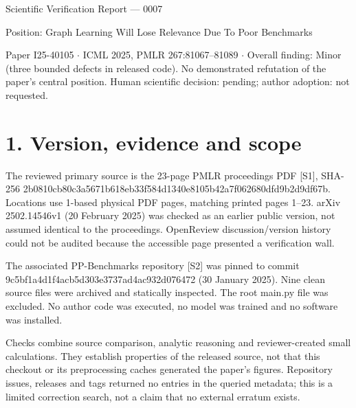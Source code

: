 \documentclass[10pt]{article}
\begin{document}
Scientific Verification Report — 0007\par
Position: Graph Learning Will Lose Relevance Due To Poor Benchmarks\par
Paper I25-40105 \(\cdot\) ICML 2025, PMLR 267:81067–81089 \(\cdot\) Overall finding: Minor (three bounded defects in released code). No demonstrated refutation of the paper’s central position. Human scientific decision: pending; author adoption: not requested.\par
\section*{1. Version, evidence and scope}
The reviewed primary source is the 23-page PMLR proceedings PDF [S1], SHA-256 2b0810cb80c3a5671b618eb33f584d1340e8105b42a7f062680dfd9b2d9df67b. Locations use 1-based physical PDF pages, matching printed pages 1–23. arXiv 2502.14546v1 (20 February 2025) was checked as an earlier public version, not assumed identical to the proceedings. OpenReview discussion/version history could not be audited because the accessible page presented a verification wall.\par
The associated PP-Benchmarks repository [S2] was pinned to commit 9c5bf1a4d1f4acb5d303e3737ad4ac932d076472 (30 January 2025). Nine clean source files were archived and statically inspected. The root main.py file was excluded. No author code was executed, no model was trained and no software was installed.\par
Checks combine source comparison, analytic reasoning and reviewer-created small calculations. They establish properties of the released source, not that this checkout or its preprocessing caches generated the paper’s figures. Repository issues, releases and tags returned no entries in the queried metadata; this is a limited correction search, not a claim that no external erratum exists.\par
\end{document}
